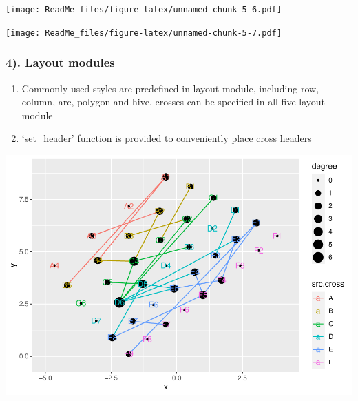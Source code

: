 \documentclass[
]{article}
\newenvironment{Shaded}{\begin{snugshade}}{\end{snugshade}}
\newcommand{\CommentTok}[1]{\textcolor[rgb]{0.56,0.35,0.01}{\textit{#1}}}
\newcommand{\DataTypeTok}[1]{\textcolor[rgb]{0.13,0.29,0.53}{#1}}
\newcommand{\DecValTok}[1]{\textcolor[rgb]{0.00,0.00,0.81}{#1}}
\newcommand{\FloatTok}[1]{\textcolor[rgb]{0.00,0.00,0.81}{#1}}
\newcommand{\KeywordTok}[1]{\textcolor[rgb]{0.13,0.29,0.53}{\textbf{#1}}}
\newcommand{\NormalTok}[1]{#1}
\newcommand{\OperatorTok}[1]{\textcolor[rgb]{0.81,0.36,0.00}{\textbf{#1}}}
\newcommand{\StringTok}[1]{\textcolor[rgb]{0.31,0.60,0.02}{#1}}
\providecommand{\tightlist}{%
  \setlength{\itemsep}{0pt}\setlength{\parskip}{0pt}}
\begin{document}
\texttt{[image: ReadMe\_files/figure-latex/unnamed-chunk-5-6.pdf]}

\begin{Shaded}
\end{Shaded}

\texttt{[image: ReadMe\_files/figure-latex/unnamed-chunk-5-7.pdf]}

\hypertarget{layout-modules}{%
\subsubsection{4). Layout modules}\label{layout-modules}}

\begin{enumerate}
\def\labelenumi{\alph{enumi}.}
\tightlist
\item
  Commonly used styles are predefined in layout module, including row,
  column, arc, polygon and hive. crosses can be specified in all five
  layout module
\item
  `set\_header' function is provided to conveniently place cross headers
\end{enumerate}

\begin{Shaded}
\end{Shaded}

\includegraphics{ReadMe_files/figure-latex/unnamed-chunk-6-1.pdf}
\end{document}
